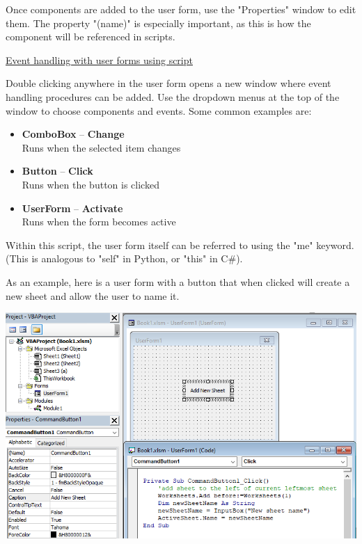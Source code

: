\documentclass[8pt]{extarticle}
\begin{document}
\begin{multicols}{3}
Once components are added to the user form, use the "Properties" window to edit them. The property "(name)" is especially important, as this is how the component will be referenced in scripts. \\

\begin{center}
    \underline{Event handling with user forms using script}
\end{center}

Double clicking anywhere in the user form opens a new window where event handling procedures can be added. Use the dropdown menus at the top of the window to choose components and events. Some common examples are: 
\begin{itemize}
    \item \textbf{ComboBox} – \textbf{Change}\\
    Runs when the selected item changes
    \item \textbf{Button} – \textbf{Click} \\
    Runs when the button is clicked
    \item \textbf{UserForm} – \textbf{Activate} \\
    Runs when the form becomes active
\end{itemize}

\begin{tcolorbox}[colback=gray!10, colframe=gray!50]
Within this script, the user form itself can be referred to using the "me" keyword. (This is analogous to "self" in Python, or "this" in C\#).
\end{tcolorbox}

As an example, here is a user form with a button that when clicked will create a new sheet and allow the user to name it.

\begin{center}
    \includegraphics[width=\columnwidth]{images/UserFormEg.png}
\end{center}


\end{multicols}
\end{document}
